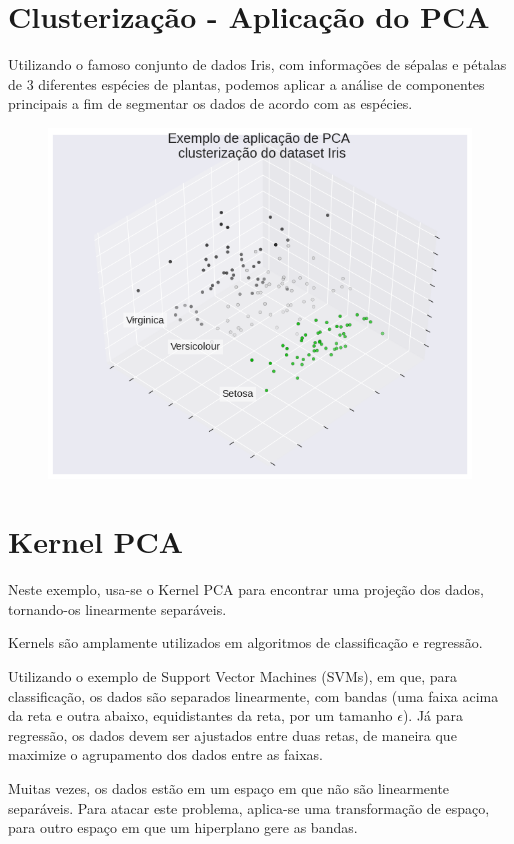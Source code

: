 \documentclass{article}
\begin{document}
\pagebreak 

\section{Clusterização - Aplicação do PCA}

\hfill

Utilizando o famoso conjunto de dados Iris, com informações de sépalas e pétalas de 3 diferentes espécies de plantas, podemos aplicar a análise de componentes principais a fim de segmentar os dados de acordo com as espécies.


\begin{figure}[ht]
\begin{center}
  \includegraphics[width=0.6\linewidth]{images/pca_iris.png}
\end{center}
\end{figure}

\pagebreak

\section{Kernel PCA}

\hfill

Neste exemplo, usa-se o Kernel PCA para encontrar uma projeção dos dados, tornando-os linearmente separáveis.

Kernels são amplamente utilizados em algoritmos de classificação e regressão.

Utilizando o exemplo de Support Vector Machines (SVMs), em que, para classificação, os dados são separados linearmente, com bandas (uma faixa acima da reta e outra abaixo, equidistantes da reta, por um tamanho $\epsilon$). Já para regressão, os dados devem ser ajustados entre duas retas, de maneira que maximize o agrupamento dos dados entre as faixas.

Muitas vezes, os dados estão em um espaço em que não são linearmente separáveis. Para atacar este problema, aplica-se uma transformação de espaço, para outro espaço em que um hiperplano gere as bandas.
\end{document}
